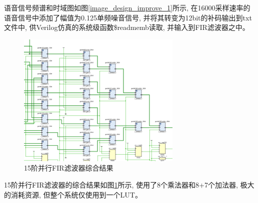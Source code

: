 \documentclass{article}
\begin{document}
语音信号频谱和时域图如图\ref{image_design_improve_1}所示, 在16000采样速率的语音信号中添加了幅值为0.125单频噪音信号,
并将其转变为12bit的补码输出到txt文件中, 供Verilog仿真的系统级函数\$readmemb读取, 并输入到FIR滤波器之中。
\begin{figure}[H]
    \centering
    \includegraphics[width=0.7\textwidth]{image/2024-06-27-02-27-52.png}
    \caption{15阶并行FIR滤波器综合结果}
    \label{image_design_improve_2}
\end{figure}
15阶并行FIR滤波器的综合结果如图\ref{image_design_improve_2}所示, 使用了8个乘法器和8+7个加法器, 极大的消耗资源, 但整个系统仅使用到一个LUT。
\end{document}
